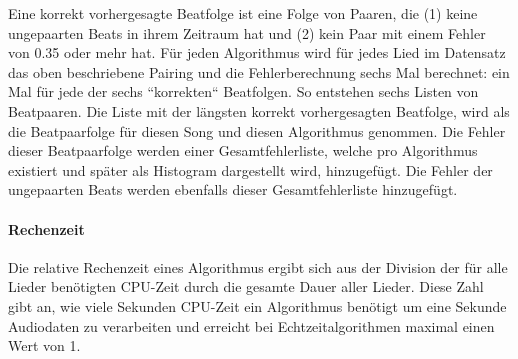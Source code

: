 {{{			%
			Eine korrekt vorhergesagte Beatfolge ist eine Folge von Paaren,
				die (1) keine ungepaarten Beats in ihrem Zeitraum hat und
				(2) kein Paar mit einem Fehler von \num{0.35} oder mehr hat.
			Für jeden Algorithmus wird für jedes Lied im Datensatz das oben beschriebene Pairing und die Fehlerberechnung
				sechs Mal berechnet:
				ein Mal für jede der sechs ``korrekten`` Beatfolgen.
			So entstehen sechs Listen von Beatpaaren.
			Die Liste mit der längsten korrekt vorhergesagten Beatfolge,
				wird als die Beatpaarfolge für diesen Song und diesen Algorithmus genommen.
			Die Fehler dieser Beatpaarfolge werden einer Gesamtfehlerliste,
				welche pro Algorithmus existiert und später als Histogram dargestellt wird,
				hinzugefügt.
			Die Fehler der ungepaarten Beats werden ebenfalls dieser Gesamtfehlerliste hinzugefügt.
		}

		\paragraph{Rechenzeit}
		{
			Die relative Rechenzeit eines Algorithmus ergibt sich aus der Division der für alle Lieder benötigten CPU-Zeit durch die gesamte Dauer aller Lieder.
			Diese Zahl gibt an,
				wie viele Sekunden CPU-Zeit ein Algorithmus benötigt um eine Sekunde Audiodaten zu verarbeiten
				und erreicht bei Echtzeitalgorithmen maximal einen Wert von \num{1}.
		}
	}
}

